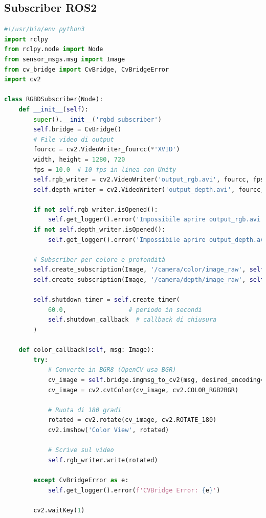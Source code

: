 \documentclass[11pt]{report}
\begin{document}
\subsection{Subscriber ROS2}
\begin{lstlisting}[language=Python, caption=Subscriber RGB-D ROS2 con salvataggio video, label=lst:rgbd_subscriber]
#!/usr/bin/env python3
import rclpy
from rclpy.node import Node
from sensor_msgs.msg import Image
from cv_bridge import CvBridge, CvBridgeError
import cv2

class RGBDSubscriber(Node):
    def __init__(self):
        super().__init__('rgbd_subscriber')
        self.bridge = CvBridge()
        # File video di output
        fourcc = cv2.VideoWriter_fourcc(*'XVID')
        width, height = 1280, 720
        fps = 10.0  # 10 fps in linea con Unity
        self.rgb_writer = cv2.VideoWriter('output_rgb.avi', fourcc, fps, (width, height))
        self.depth_writer = cv2.VideoWriter('output_depth.avi', fourcc, fps, (width, height), isColor=False)

        if not self.rgb_writer.isOpened():
            self.get_logger().error('Impossibile aprire output_rgb.avi') 
        if not self.depth_writer.isOpened():
            self.get_logger().error('Impossibile aprire output_depth.avi') 

        # Subscriber per colore e profondità
        self.create_subscription(Image, '/camera/color/image_raw', self.color_callback, 10)
        self.create_subscription(Image, '/camera/depth/image_raw', self.depth_callback, 10)

        self.shutdown_timer = self.create_timer(
            60.0,                 # periodo in secondi
            self.shutdown_callback  # callback di chiusura
        )

    def color_callback(self, msg: Image):
        try:
            # Converte in BGR8 (OpenCV usa BGR)
            cv_image = self.bridge.imgmsg_to_cv2(msg, desired_encoding='rgb8')
            cv_image = cv2.cvtColor(cv_image, cv2.COLOR_RGB2BGR)

            # Ruota di 180 gradi
            rotated = cv2.rotate(cv_image, cv2.ROTATE_180)
            cv2.imshow('Color View', rotated)

            # Scrive sul video
            self.rgb_writer.write(rotated)

        except CvBridgeError as e:
            self.get_logger().error(f'CVBridge Error: {e}')
        
        cv2.waitKey(1)


\end{lstlisting}
\end{document}
